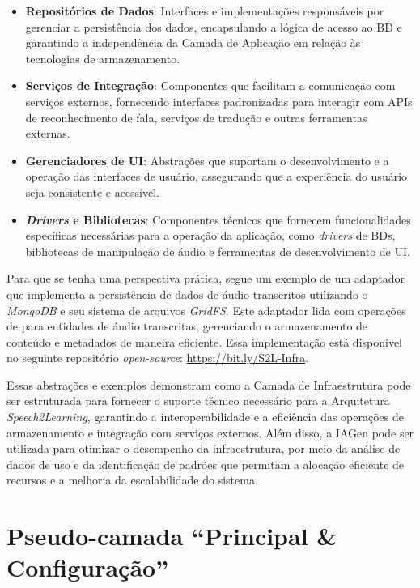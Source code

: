 \begin{itemize}
    \item \textbf{Repositórios de Dados}: Interfaces e implementações responsáveis por gerenciar a persistência dos dados, encapsulando a lógica de acesso ao BD e garantindo a independência da Camada de Aplicação em relação às tecnologias de armazenamento.

    \item \textbf{Serviços de Integração}: Componentes que facilitam a comunicação com serviços externos, fornecendo interfaces padronizadas para interagir com APIs de reconhecimento de fala, serviços de tradução e outras ferramentas externas.

    \item \textbf{Gerenciadores de UI}: Abstrações que suportam o desenvolvimento e a operação das interfaces de usuário, assegurando que a experiência do usuário seja consistente e acessível.

    \item \textbf{\textit{Drivers} e Bibliotecas}: Componentes técnicos que fornecem funcionalidades específicas necessárias para a operação da aplicação, como \textit{drivers} de BDs, bibliotecas de manipulação de áudio e ferramentas de desenvolvimento de UI.
\end{itemize}

Para que se tenha uma perspectiva prática, segue um exemplo de um adaptador que implementa a persistência de dados de áudio transcritos utilizando o \textit{MongoDB} e seu sistema de arquivos \textit{GridFS}. Este adaptador lida com operações de  para entidades de áudio transcritas, gerenciando o armazenamento de conteúdo e metadados de maneira eficiente. Essa implementação está disponível no seguinte repositório \textit{open-source}: \url{https://bit.ly/S2L-Infra}.

Essas abstrações e exemplos demonstram como a Camada de Infraestrutura pode ser estruturada para fornecer o suporte técnico necessário para a Arquitetura \textit{Speech2Learning}, garantindo a interoperabilidade e a eficiência das operações de armazenamento e integração com serviços externos. Além disso, a IAGen pode ser utilizada para otimizar o desempenho da infraestrutura, por meio da análise de dados de uso e da identificação de padrões que permitam a alocação eficiente de recursos e a melhoria da escalabilidade do sistema.

\section{Pseudo-camada ``Principal \& Configuração''}


